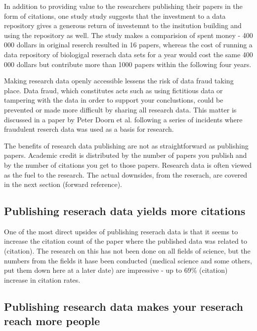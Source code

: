 In addition to providing value to the researchers publishing their papers in
the form of citations, one study \cite{piwowar2011data} study suggests that
the investment to a data repository gives a generous return of investemnt to
the insitution building and using the repository as well. The study makes a
comparision of spent money - 400 000 dollars in original reserch resulted in
16 papers, whereas the cost of running a data repository of biologigal reserach
data sets for a year would cost the same 400 000 dollars but contribute more
than 1000 papers within the following four years.

Making research data openly accessible lessens the risk of data fraud taking
place. Data fraud, which constitutes acts such as using fictitious data or
tampering with the data in order to support your conclustions, could be
prevented or made more difficult by sharing all research data. This matter is
discussed in a paper by Peter Doorn et al. \cite{DBLP:journals/ijdc/DoornDH13}
following a series of incidents where fraudulent reserch data was used as a
basis for research.

\iffalse

The benefits of research data publishing are not as straightforward as
publishing papers. Academic credit is distributed by the number of papers you
publish and by the number of citations you get to those papers. Research data
is often viewed as the fuel to the research. The actual downsides, from the
reserach, are covered in the next section (forward reference).

\subsection{Publishing reserach data yields more citations}

One of the most direct upsides of publishing reserach data is that it seems to
increase the citation count of the paper where the published data was related
to (citation). The research on this has not been done on all fields of science,
but the numbers from the fields it hase been conducted (medical science and
some others, put them down here at a later date) are impressive - up to
69\% (citation) increase in citation rates.

\subsection{Publishing research data makes your reserach reach more people}

